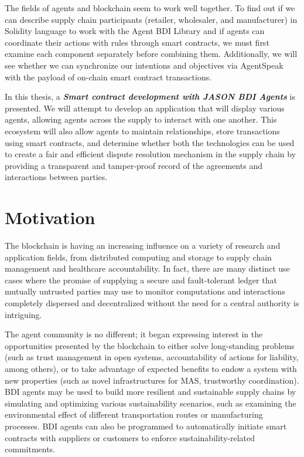 \vspace{.5cm}

The fields of agents and blockchain seem to work well together. To find out if we can describe supply chain participants (retailer, wholesaler, and manufacturer) in Solidity language to work with the Agent \ac{BDI} Library and if agents can coordinate their actions with rules through smart contracts, we must first examine each component separately before combining them. Additionally, we will see whether we can synchronize our intentions and objectives via AgentSpeak with the payload of on-chain smart contract transactions.

\vspace{.5cm}

In this thesis, a \textbf{\textit{Smart contract development with JASON \ac{BDI} Agents}} is presented. We will attempt to develop an application that will display various agents, allowing agents across the supply to interact with one another. This ecosystem will also allow agents to maintain relationships, store transactions using smart contracts, and determine whether both the technologies can be used to create a fair and efficient dispute resolution mechanism in the supply chain by providing a transparent and tamper-proof record of the agreements and interactions between parties.

\section{Motivation}

The blockchain is having an increasing influence on a variety of research and application fields, from distributed computing and storage to supply chain management and healthcare accountability. In fact, there are many distinct use cases where the promise of supplying a secure and fault-tolerant ledger that mutually untrusted parties may use to monitor computations and interactions completely dispersed and decentralized without the need for a central authority is intriguing. 

\vspace{.5cm}

The agent community is no different; it began expressing interest in the opportunities presented by the blockchain to either solve long-standing problems (such as trust management in open systems, accountability of actions for liability, among others), or to take advantage of expected benefits to endow a system with new properties (such as novel infrastructures for \ac{MAS}, trustworthy coordination). \ac{BDI} agents may be used to build more resilient and sustainable supply chains by simulating and optimizing various sustainability scenarios, such as examining the environmental effect of different transportation routes or manufacturing processes. \ac{BDI} agents can also be programmed to automatically initiate smart contracts with suppliers or customers to enforce sustainability-related commitments.

